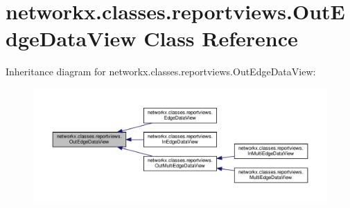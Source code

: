 \hypertarget{classnetworkx_1_1classes_1_1reportviews_1_1OutEdgeDataView}{}\section{networkx.\+classes.\+reportviews.\+Out\+Edge\+Data\+View Class Reference}
\label{classnetworkx_1_1classes_1_1reportviews_1_1OutEdgeDataView}


Inheritance diagram for networkx.\+classes.\+reportviews.\+Out\+Edge\+Data\+View\+:
\nopagebreak
\begin{figure}[H]
\begin{center}
\leavevmode
\includegraphics[width=350pt]{classnetworkx_1_1classes_1_1reportviews_1_1OutEdgeDataView__inherit__graph}
\end{center}
\end{figure}
